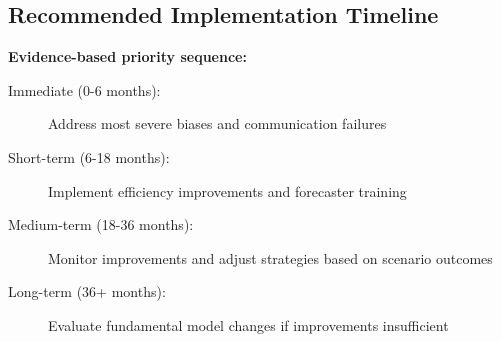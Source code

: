 \documentclass[11pt,a4paper]{article}
\begin{document}
\subsection{Recommended Implementation Timeline}
\textbf{Evidence-based priority sequence:}

\begin{description}
\item[Immediate (0-6 months):] Address most severe biases and communication failures
\item[Short-term (6-18 months):] Implement efficiency improvements and forecaster training
\item[Medium-term (18-36 months):] Monitor improvements and adjust strategies based on scenario outcomes
\item[Long-term (36+ months):] Evaluate fundamental model changes if improvements insufficient
\end{description}
\end{document}
